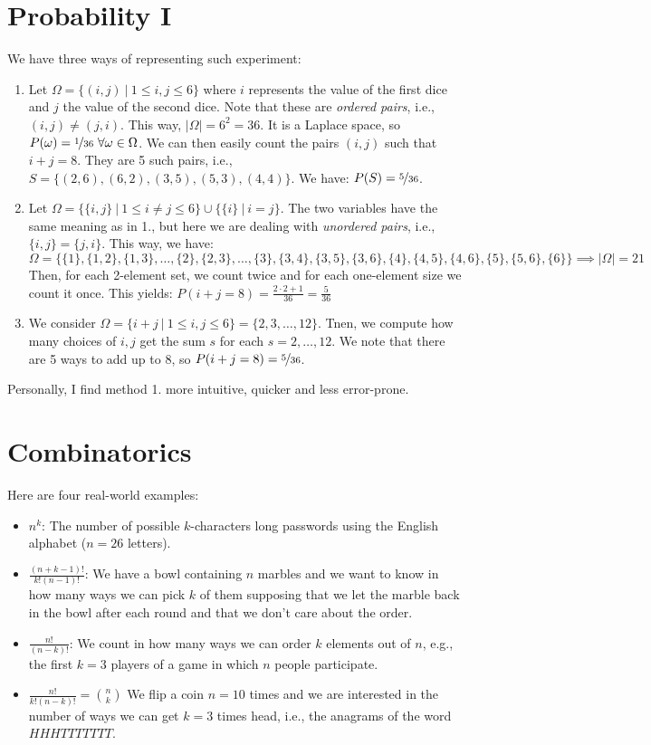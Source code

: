 \documentclass{article}
\begin{document}
\section{Probability I}
We have three ways of representing such experiment: 
\begin{enumerate}
    \item Let $\Omega = \{(i,j) \ | \ 1 \leq i,j \leq 6\}$ where $i$ represents the value of the first dice and $j$ the value of the second dice. Note that these are \textit{ordered pairs}, i.e., $(i,j) \neq (j,i)$. This way, $|\Omega| = 6^2 = 36$. It is a Laplace space, so $P(\omega) = \nicefrac{1}{36} \ \forall \omega \in \Omega$. 
    We can then easily count the pairs $(i, j)$ such that $i+j=8$. They are 5 such pairs, i.e., $S = \{(2,6), (6,2), (3,5), (5,3), (4,4)\}$. We have: $P(S) = \nicefrac{5}{36}$. 
    \item Let $\Omega = \{\{i,j\} \ | \ 1 \leq i \neq j \leq 6\} \cup \{\{i\} \ | \ i=j\}$. The two variables have the same meaning as in 1., but here we are dealing with \textit{unordered pairs}, i.e., $\{i,j\} = \{j,i\}$. This way, we have: \[\Omega =  \{\{1\}, \{1,2\}, \{1,3\}, \ldots, \{2\}, \{2,3\}, \ldots, \{3\}, \{3,4\}, \{3,5\}, \{3,6\}, \{4\}, \{4,5\}, \{4,6\}, \{5\}, \{5,6\}, \{6\}\} \implies |\Omega| = 21\]
    Then, for each 2-element set, we count twice and for each one-element size we count it once. This yields: $P(i+j = 8) = \frac{2 \cdot 2 + 1}{36} = \frac{5}{36}$
    \item We consider $\Omega = \{i+j \ | \ 1 \leq i,j \leq 6\} = \{2, 3, \ldots, 12\}$. Tnen, we compute how many choices of $i,j$ get the sum $s$ for each $s = 2, \ldots, 12$. We note that there are 5 ways to add up to 8, so $P(i+j = 8) = \nicefrac{5}{36}$. 
\end{enumerate}
Personally, I find method 1. more intuitive, quicker and less error-prone.

\section{Combinatorics}
Here are four real-world examples: 
\begin{itemize}
    \item $n^k$: The number of possible $k$-characters long passwords using the English alphabet ($n=26$ letters). 
    \item $\frac{(n+k-1)!}{k!(n-1)!}$: We have a bowl containing $n$ marbles and we want to know in how many ways we can pick $k$ of them supposing that we let the marble back in the bowl after each round and that we don't care about the order. 
    \item $\frac{n!}{(n-k)!}$: We count in how many ways we can order $k$ elements out of $n$, e.g., the first $k=3$ players of a game in which $n$ people participate.
    \item $\frac{n!}{k!(n-k)!} = \binom{n}{k}$ We flip a coin $n=10$ times and we are interested in the number of ways we can get $k=3$ times head, i.e., the anagrams of the word $HHHTTTTTTT$.
\end{itemize}
\end{document}

